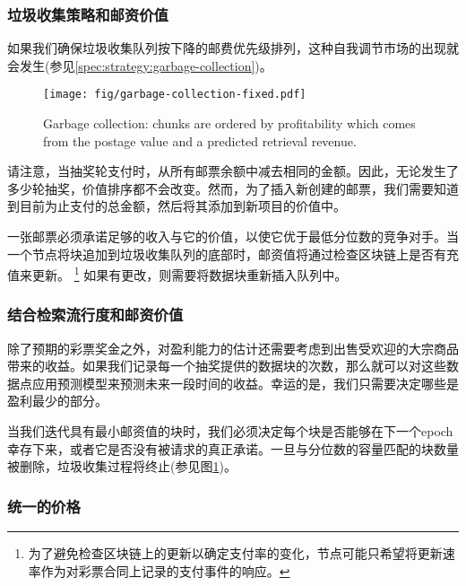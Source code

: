 \subsubsection{垃圾收集策略和邮资价值}

如果我们确保垃圾收集队列按下降的邮费优先级排列，这种自我调节市场的出现就会发生(参见\ref{spec:strategy:garbage-collection})。

\begin{figure}[htbp]
  \centering
  \texttt{[image: fig/garbage-collection-fixed.pdf]}
  \caption[Garbage collection \statusgreen]{Garbage collection: chunks are ordered by profitability which comes from the postage value and a predicted retrieval revenue.}
  \label{fig:garbage-collection}
\end{figure}


请注意，当抽奖轮支付时，从所有邮票余额中减去相同的金额。因此，无论发生了多少轮抽奖，价值排序都不会改变。然而，为了插入新创建的邮票，我们需要知道到目前为止支付的总金额，然后将其添加到新项目的价值中。

一张邮票必须承诺足够的收入与它的价值，以使它优于最低分位数的竞争对手。当一个节点将块追加到垃圾收集队列的底部时，邮资值将通过检查区块链上是否有充值来更新。%
%
\footnote{为了避免检查区块链上的更新以确定支付率的变化，节点可能只希望将更新速率作为对彩票合同上记录的支付事件的响应。}
%
如果有更改，则需要将数据块重新插入队列中。 

\subsubsection{结合检索流行度和邮资价值}

除了预期的彩票奖金之外，对盈利能力的估计还需要考虑到出售受欢迎的大宗商品带来的收益。如果我们记录每一个抽奖提供的数据块的次数，那么就可以对这些数据点应用预测模型来预测未来一段时间的收益。幸运的是，我们只需要决定哪些是盈利最少的部分。 



当我们迭代具有最小邮资值的块时，我们必须决定每个块是否能够在下一个epoch幸存下来，或者它是否没有被请求的真正承诺。一旦与分位数的容量匹配的块数量被删除，垃圾收集过程将终止(参见图\ref{fig:garbage-collection})。

\subsubsection{统一的价格} 


